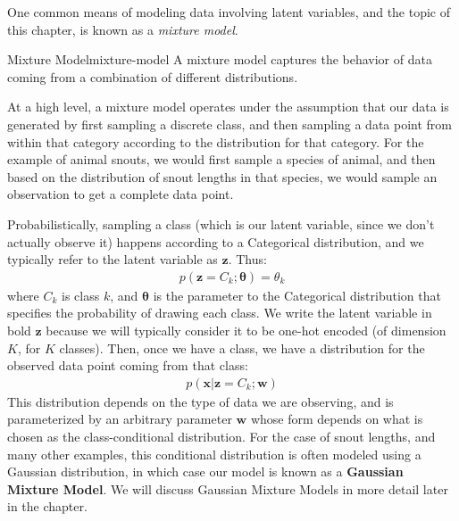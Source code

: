One common means of modeling data involving latent variables, and the topic of this chapter, is known as a \textit{mixture model}.

\begin{definition}{Mixture Model}{mixture-model}
    A mixture model captures the behavior of data coming from a combination of different distributions.
\end{definition}

At a high level, a mixture model operates under the assumption that our data is generated by first sampling a discrete class, and then sampling a data point from within that category according to the distribution for that category. For the example of animal snouts, we would first sample a species of animal, and then based on the distribution of snout lengths in that species, we would sample an observation to get a complete data point.

Probabilistically, sampling a class (which is our latent variable, since we don't actually observe it) happens according to a Categorical distribution, and we typically refer to the latent variable as $\textbf{z}$. Thus:
\begin{align*}
    p(\textbf{z} = C_{k} ; \boldsymbol{\theta}) = \theta_{k}
\end{align*}
where $C_{k}$ is class $k$, and $\boldsymbol{\theta}$ is the parameter to the Categorical distribution that specifies the probability of drawing each class. We write the latent variable in bold $\textbf{z}$ because  we will typically
consider it to be one-hot encoded (of dimension $K$, for $K$ classes).
Then, once we have a class, we have a distribution for the observed data point coming from that class:
\begin{align*}
    p(\textbf{x} | \textbf{z} = C_{k}; \textbf{w})
\end{align*}
This distribution depends on the type of data we are observing, and is parameterized by an arbitrary parameter $\textbf{w}$ whose form depends on what is chosen as the class-conditional distribution. For the case of snout lengths, and many other examples, this conditional distribution is often modeled using a Gaussian distribution, in which case our model is known as a \textbf{Gaussian Mixture Model}. We will discuss Gaussian Mixture Models in more detail later in the chapter.

